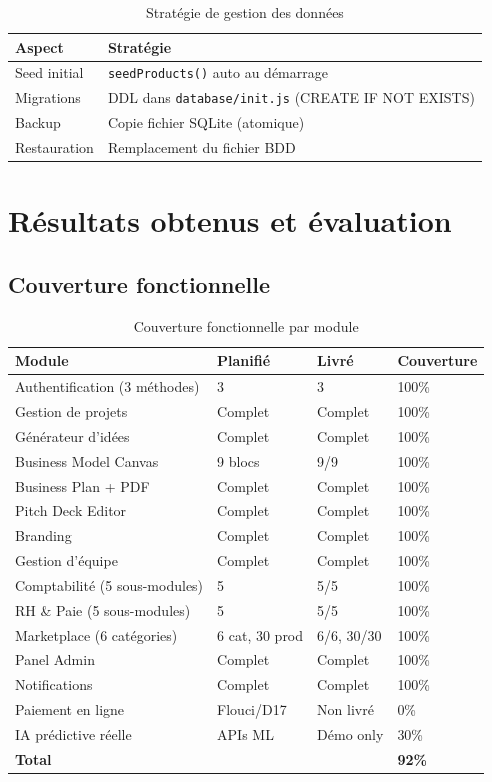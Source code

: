 \begin{table}[H]
\centering
\caption{Stratégie de gestion des données}
\label{tab:data-mgmt}
\begin{tabular}{|l|l|}
\hline
\textbf{Aspect} & \textbf{Stratégie} \\
\hline
Seed initial & \texttt{seedProducts()} auto au démarrage \\
\hline
Migrations & DDL dans \texttt{database/init.js} (CREATE IF NOT EXISTS) \\
\hline
Backup & Copie fichier SQLite (atomique) \\
\hline
Restauration & Remplacement du fichier BDD \\
\hline
\end{tabular}
\end{table}

\section{Résultats obtenus et évaluation}

\subsection{Couverture fonctionnelle}

\begin{table}[H]
\centering
\caption{Couverture fonctionnelle par module}
\label{tab:coverage}
\begin{tabular}{|l|l|l|l|}
\hline
\textbf{Module} & \textbf{Planifié} & \textbf{Livré} & \textbf{Couverture} \\
\hline
Authentification (3 méthodes) & 3 & 3 & 100\% \\
\hline
Gestion de projets & Complet & Complet & 100\% \\
\hline
Générateur d'idées & Complet & Complet & 100\% \\
\hline
Business Model Canvas & 9 blocs & 9/9 & 100\% \\
\hline
Business Plan + PDF & Complet & Complet & 100\% \\
\hline
Pitch Deck Editor & Complet & Complet & 100\% \\
\hline
Branding & Complet & Complet & 100\% \\
\hline
Gestion d'équipe & Complet & Complet & 100\% \\
\hline
Comptabilité (5 sous-modules) & 5 & 5/5 & 100\% \\
\hline
RH \& Paie (5 sous-modules) & 5 & 5/5 & 100\% \\
\hline
Marketplace (6 catégories) & 6 cat, 30 prod & 6/6, 30/30 & 100\% \\
\hline
Panel Admin & Complet & Complet & 100\% \\
\hline
Notifications & Complet & Complet & 100\% \\
\hline
Paiement en ligne & Flouci/D17 & Non livré & 0\% \\
\hline
IA prédictive réelle & APIs ML & Démo only & 30\% \\
\hline
\textbf{Total} & & & \textbf{92\%} \\
\hline
\end{tabular}
\end{table}

